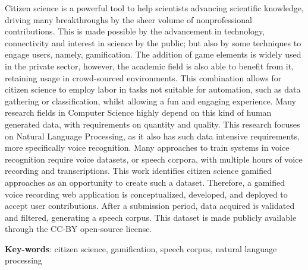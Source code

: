 
\setlength{\absparsep}{18pt}
\begin{resumo}
    Citizen science is a powerful tool to help scientists advancing scientific knowledge, driving many breakthroughs by the sheer volume of nonprofessional contributions. This is made possible by the advancement in technology, connectivity and interest in science by the public; but also by some techniques to engage users, namely, gamification. The addition of game elements is widely used in the private sector, however, the academic field is also able to benefit from it,
    retaining usage in crowd-sourced environments. This combination allows for citizen science to employ labor in tasks not suitable for automation, such as data gathering or classification, whilst allowing a fun and engaging experience. Many research fields in Computer Science highly depend on this kind of human generated data, with requirements on quantity and quality. This research focuses on Natural Language Processing, as it also has such data intensive requirements, more specifically voice recognition. Many approaches to train systems in voice recognition require voice datasets, or speech corpora, with multiple hours of voice recording and transcriptions. This work identifies citizen science gamified approaches as an opportunity to create such a dataset. Therefore, a gamified voice recording web application is conceptualized, developed, and deployed to accept user contributions. After a submission period, data acquired is validated and filtered, generating a speech corpus. This dataset is made publicly available through the CC-BY open-source license.
	\vspace{\onelineskip}
	\noindent 
	
	\textbf{Key-words}: citizen science, gamification, speech corpus, natural language processing
\end{resumo}
